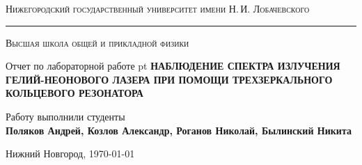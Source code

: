 \begin{titlepage}
	\begin{center}
	{\textsc{Нижегородский государственный университет имени Н.\,И. Лобачевского}}
	\vskip 2pt \hrule \vskip 3pt
	{\textsc{Высшая школа общей и прикладной физики}}

	\vfill


	{{\large Отчет по лабораторной работе} pt {\Large \bfseries НАБЛЮДЕНИЕ СПЕКТРА ИЗЛУЧЕНИЯ ГЕЛИЙ-НЕОНОВОГО ЛАЗЕРА ПРИ ПОМОЩИ ТРЕХЗЕРКАЛЬНОГО КОЛЬЦЕВОГО РЕЗОНАТОРА}}

		
	\vspace{2cm}
	{\large Работу выполнили студенты \\[0.5em]{\Large \bfseries Поляков Андрей, Козлов Александр, Роганов Николай, Былинский Никита}}

	\end{center}

	\vfill

	\begin{center}
	{Нижний Новгород, \today}
	\end{center}
\end{titlepage}